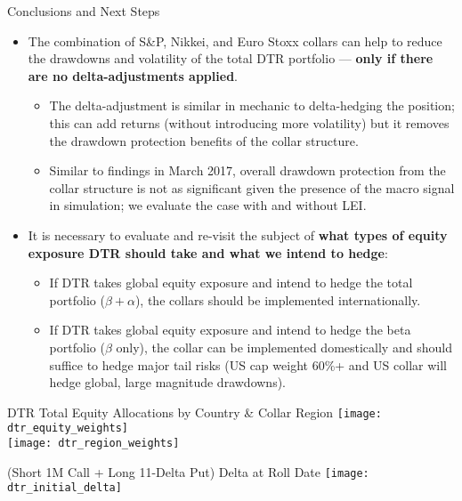 \documentclass{beamer}
\begin{document}
\begin{frame}{Conclusions and Next Steps}
\begin{itemize}
\item The combination of S\&P, Nikkei, and Euro Stoxx collars can help to reduce the drawdowns and volatility of the total DTR portfolio --- {\bf only if there are no delta-adjustments applied}.

	\begin{itemize}
	\item The delta-adjustment is similar in mechanic to delta-hedging the position; this can add returns (without introducing more volatility) but it removes the drawdown protection benefits 		of the collar structure.
	\item Similar to findings in March 2017, overall drawdown protection from the collar structure is not as significant given the presence of the macro signal in simulation; we evaluate the 		case with and without LEI.
	\end{itemize}
\item It is necessary to evaluate and re-visit the subject of {\bf what types of equity exposure DTR should take and what we intend to hedge}:

	\begin{itemize}
	\item If DTR takes global equity exposure and intend to hedge the total portfolio ($\beta + \alpha$), the collars should be implemented internationally.
	\item If DTR takes global equity exposure and intend to hedge the beta portfolio ($\beta$ only), the collar can be implemented domestically and should suffice to hedge major tail risks (US cap weight 60\%+ and US collar will hedge global, large magnitude drawdowns).
	\end{itemize}
\end{itemize}
\end{frame}

\begin{frame}{DTR Total Equity Allocations by Country \& Collar Region}
\texttt{[image: dtr\_equity\_weights]} \\
\texttt{[image: dtr\_region\_weights]}
\end{frame}

\begin{frame}{(Short 1M Call + Long 11-Delta Put) Delta at Roll Date}
\texttt{[image: dtr\_initial\_delta]}
\end{frame}
\end{document}

